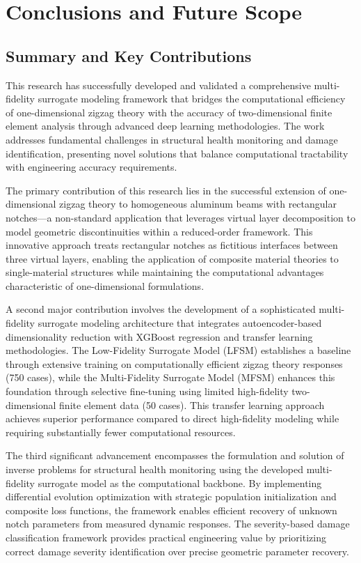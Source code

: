 \chapter{Conclusions and Future Scope}
\label{chap:conclusions}

\section{Summary and Key Contributions}
This research has successfully developed and validated a comprehensive multi-fidelity surrogate modeling framework that bridges the computational efficiency of one-dimensional zigzag theory with the accuracy of two-dimensional finite element analysis through advanced deep learning methodologies. The work addresses fundamental challenges in structural health monitoring and damage identification, presenting novel solutions that balance computational tractability with engineering accuracy requirements.

The primary contribution of this research lies in the successful extension of one-dimensional zigzag theory to homogeneous aluminum beams with rectangular notches—a non-standard application that leverages virtual layer decomposition to model geometric discontinuities within a reduced-order framework. This innovative approach treats rectangular notches as fictitious interfaces between three virtual layers, enabling the application of composite material theories to single-material structures while maintaining the computational advantages characteristic of one-dimensional formulations.

A second major contribution involves the development of a sophisticated multi-fidelity surrogate modeling architecture that integrates autoencoder-based dimensionality reduction with XGBoost regression and transfer learning methodologies. The Low-Fidelity Surrogate Model (LFSM) establishes a baseline through extensive training on computationally efficient zigzag theory responses (750 cases), while the Multi-Fidelity Surrogate Model (MFSM) enhances this foundation through selective fine-tuning using limited high-fidelity two-dimensional finite element data (50 cases). This transfer learning approach achieves superior performance compared to direct high-fidelity modeling while requiring substantially fewer computational resources.

The third significant advancement encompasses the formulation and solution of inverse problems for structural health monitoring using the developed multi-fidelity surrogate model as the computational backbone. By implementing differential evolution optimization with strategic population initialization and composite loss functions, the framework enables efficient recovery of unknown notch parameters from measured dynamic responses. The severity-based damage classification framework provides practical engineering value by prioritizing correct damage severity identification over precise geometric parameter recovery.

